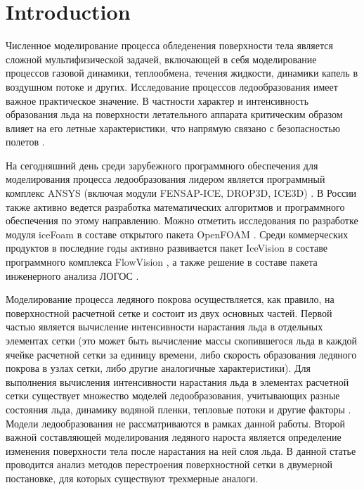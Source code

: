 \documentclass[
11pt,%
tightenlines,%
twoside,%
onecolumn,%
nofloats,%
nobibnotes,%
nofootinbib,%
superscriptaddress,%
noshowpacs,%
centertags]%
{revtex4}
\begin{document}


\maketitle



\section{Introduction}

Численное моделирование процесса обледенения поверхности тела является сложной мультифизической задачей, включающей в себя моделирование процессов газовой динамики, теплообмена, течения жидкости, динамики капель в воздушном потоке и других.
Исследование процессов ледообразования имеет важное практическое значение.
В частности характер и интенсивность образования льда на поверхности летательного аппарата критическим образом влияет на его летные характеристики, что напрямую связано с безопасностью полетов \cite{Raj}.

На сегодняшний день среди зарубежного программного обеспечения для моделирования процесса ледообразования лидером является программный комплекс ANSYS (включая модули FENSAP-ICE, DROP3D, ICE3D) \cite{Martini}.
В России также активно ведется разработка математических алгоритмов и программного обеспечения по этому направлению.
Можно отметить исследования по разработке модуля iceFoam в составе открытого пакета OpenFOAM \cite{Koshelev}.
Среди коммерческих продуктов в последние годы активно развивается пакет IceVision в составе программного комплекса FlowVision \cite{Sorokin}, а также решение в составе пакета инженерного анализа ЛОГОС \cite{Galanov}.

Моделирование процесса ледяного покрова осуществляется, как правило, на поверхностной расчетной сетке и состоит из двух основных частей.
Первой частью является вычисление интенсивности нарастания льда в отдельных элементах сетки (это может быть вычисление массы скопившегося льда в каждой ячейке расчетной сетки за единицу времени, либо скорость образования ледяного покрова в узлах сетки, либо другие аналогичные характеристики).
Для выполнения вычисления интенсивности нарастания льда в элементах расчетной сетки существует множество моделей ледообразования, учитывающих разные состояния льда, динамику водяной пленки, тепловые потоки и другие факторы \cite{Bartkus,Zhang,Pena}.
Модели ледообразования не рассматриваются в рамках данной работы.
Второй важной составляющей моделирования ледяного нароста является определение изменения поверхности тела после нарастания на ней слоя льда.
В данной статье проводится анализ методов перестроения поверхностной сетки в двумерной постановке, для которых существуют трехмерные аналоги.
\end{document}
